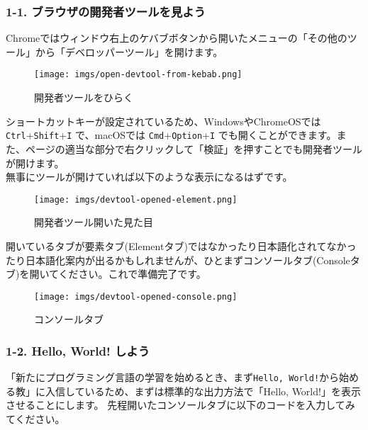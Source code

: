 \subsubsection{1-1.
ブラウザの開発者ツールを見よう}\label{ux30d6ux30e9ux30a6ux30b6ux306eux958bux767aux8005ux30c4ux30fcux30ebux3092ux898bux3088ux3046}

Chromeではウィンドウ右上のケバブボタンから開いたメニューの「その他のツール」から「デベロッパーツール」を開けます。

\begin{figure}
\centering
\texttt{[image: imgs/open-devtool-from-kebab.png]}
\caption{開発者ツールをひらく}
\end{figure}

ショートカットキーが設定されているため、WindowsやChromeOSでは
\texttt{Ctrl}+\texttt{Shift}+\texttt{I} で、macOSでは
\texttt{Cmd}+\texttt{Option}+\texttt{I}
でも開くことができます。また、ページの適当な部分で右クリックして「検証」を押すことでも開発者ツールが開けます。\\
無事にツールが開けていれば以下のような表示になるはずです。

\begin{figure}
\centering
\texttt{[image: imgs/devtool-opened-element.png]}
\caption{開発者ツール開いた見た目}
\end{figure}

開いているタブが要素タブ(Elementタブ)ではなかったり日本語化されてなかったり日本語化案内が出るかもしれませんが、ひとまずコンソールタブ(Consoleタブ)を開いてください。これで準備完了です。

\begin{figure}
\centering
\texttt{[image: imgs/devtool-opened-console.png]}
\caption{コンソールタブ}
\end{figure}

\subsubsection{1-2. Hello, World!
しよう}\label{hello-world-ux3057ux3088ux3046}

「新たにプログラミング言語の学習を始めるとき、まず\texttt{Hello,\ World!}から始める教」に入信しているため、まずは標準的な出力方法で「Hello,
World!」を表示させることにします。
先程開いたコンソールタブに以下のコードを入力してみてください。

\begin{Shaded}
\begin{Highlighting}[]
\NormalTok{(}\NormalTok{)}\OperatorTok{;}
\end{Highlighting}
\end{Shaded}

